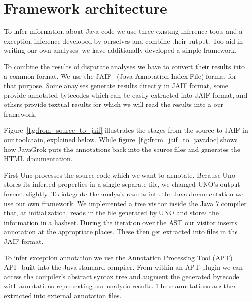 \section{Framework architecture}

\begin{figure*}
\centering
{}
\caption{Toolchain from source to JAIF}
\label{fig:from_source_to_jaif}
\end{figure*}

To infer information about Java code we use three existing inference tools and 
a exception inference developed by ourselves and combine their output. 
Too aid in writing our own analyses, we have additionally developed a simple 
framework. 

To combine the results of disparate analyses we have to convert their results
into a common format.  We use the JAIF~\cite{JAIF}
(Java Annotation Index File) format for that purpose.  Some anaylses generate
results directly in JAIF format, some provide annotated bytecodes which can be
easily extracted into JAIF format, and others provide textual results for which
we will read the results into a our framework.

Figure~\ref{fig:from_source_to_jaif} 
illustrates the stages from the source to JAIF in our toolchain, explained 
below. While figure~\ref{fig:from_jaif_to_javadoc} shows how JavaGrok
puts the annotations back into the source files and generates the HTML
documentation.

\begin{figure*}
\centering
{}
\caption{From JAIF to Javadoc}
\label{fig:from_jaif_to_javadoc}
\end{figure*}

First Uno processes the source code which we want to annotate. 
Because Uno stores its inferred properties in a single separate file, 
we changed UNO's output format slightly.
To integrate the analysis results into the Java documentation we
use our own framework. We implemented a tree visitor inside the Java 7 
compiler that, at initialization, reads in the file generated by UNO and 
stores the information in a hashset. During the iteration over the AST
our visitor inserts annotation at the appropriate places. These then
get extracted into files in the JAIF format.

To infer exception annotation we use the Annotation Processing Tool (APT)
API~\cite{apt} built into the Java standard compiler.
From within an APT plugin
we can access the compiler's abstract syntax tree and augment the generated
bytecode with annotations representing our analysis results. These annotations
are then extracted into external annotation files.

